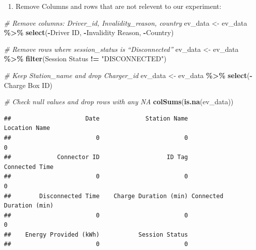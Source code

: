 \documentclass[
  12pt,
]{article}
\newenvironment{Shaded}{\begin{snugshade}}{\end{snugshade}}
\newcommand{\AttributeTok}[1]{\textcolor[rgb]{0.13,0.29,0.53}{#1}}
\newcommand{\CommentTok}[1]{\textcolor[rgb]{0.56,0.35,0.01}{\textit{#1}}}
\newcommand{\FunctionTok}[1]{\textcolor[rgb]{0.13,0.29,0.53}{\textbf{#1}}}
\newcommand{\NormalTok}[1]{#1}
\newcommand{\OtherTok}[1]{\textcolor[rgb]{0.56,0.35,0.01}{#1}}
\newcommand{\SpecialCharTok}[1]{\textcolor[rgb]{0.81,0.36,0.00}{\textbf{#1}}}
\newcommand{\StringTok}[1]{\textcolor[rgb]{0.31,0.60,0.02}{#1}}
\providecommand{\tightlist}{%
  \setlength{\itemsep}{0pt}\setlength{\parskip}{0pt}}
\begin{document}
\begin{enumerate}
\def\labelenumi{\arabic{enumi}.}
\setcounter{enumi}{2}
\tightlist
\item
  Remove Columns and rows that are not relevent to our experiment:
\end{enumerate}

\begin{Shaded}
\begin{Highlighting}[]
\CommentTok{\# Remove columns: Driver\_id, Invalidity\_reason, country}
\NormalTok{ev\_data }\OtherTok{\textless{}{-}}\NormalTok{ ev\_data }\SpecialCharTok{\%\textgreater{}\%}
    \FunctionTok{select}\NormalTok{(}\SpecialCharTok{{-}}\StringTok{\textasciigrave{}}\AttributeTok{Driver ID}\StringTok{\textasciigrave{}}\NormalTok{, }\SpecialCharTok{{-}}\StringTok{\textasciigrave{}}\AttributeTok{Invalidity Reason}\StringTok{\textasciigrave{}}\NormalTok{, }\SpecialCharTok{{-}}\NormalTok{Country)}

\CommentTok{\# Remove rows where session\_status is “Disconnected”}
\NormalTok{ev\_data }\OtherTok{\textless{}{-}}\NormalTok{ ev\_data }\SpecialCharTok{\%\textgreater{}\%}
    \FunctionTok{filter}\NormalTok{(}\StringTok{\textasciigrave{}}\AttributeTok{Session Status}\StringTok{\textasciigrave{}} \SpecialCharTok{!=} \StringTok{"DISCONNECTED"}\NormalTok{)}

\CommentTok{\# Keep Station\_name and drop Charger\_id}
\NormalTok{ev\_data }\OtherTok{\textless{}{-}}\NormalTok{ ev\_data }\SpecialCharTok{\%\textgreater{}\%}
    \FunctionTok{select}\NormalTok{(}\SpecialCharTok{{-}}\StringTok{\textasciigrave{}}\AttributeTok{Charge Box ID}\StringTok{\textasciigrave{}}\NormalTok{)}

\CommentTok{\# Check null values and drop rows with any NA}
\FunctionTok{colSums}\NormalTok{(}\FunctionTok{is.na}\NormalTok{(ev\_data))}
\end{Highlighting}
\end{Shaded}

\begin{verbatim}
##                     Date             Station Name            Location Name 
##                        0                        0                        0 
##             Connector ID                   ID Tag           Connected Time 
##                        0                        0                        0 
##        Disconnected Time    Charge Duration (min) Connected Duration (min) 
##                        0                        0                        0 
##    Energy Provided (kWh)           Session Status 
##                        0                        0
\end{verbatim}
\end{document}
